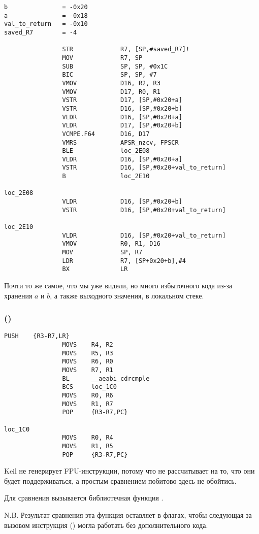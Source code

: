 \begin{lstlisting}[caption=\NonOptimizingXcodeIV (\ARMMode)]
b               = -0x20
a               = -0x18
val_to_return   = -0x10
saved_R7        = -4

                STR             R7, [SP,#saved_R7]!
                MOV             R7, SP
                SUB             SP, SP, #0x1C
                BIC             SP, SP, #7
                VMOV            D16, R2, R3
                VMOV            D17, R0, R1
                VSTR            D17, [SP,#0x20+a]
                VSTR            D16, [SP,#0x20+b]
                VLDR            D16, [SP,#0x20+a]
                VLDR            D17, [SP,#0x20+b]
                VCMPE.F64       D16, D17
                VMRS            APSR_nzcv, FPSCR
                BLE             loc_2E08
                VLDR            D16, [SP,#0x20+a]
                VSTR            D16, [SP,#0x20+val_to_return]
                B               loc_2E10

loc_2E08
                VLDR            D16, [SP,#0x20+b]
                VSTR            D16, [SP,#0x20+val_to_return]

loc_2E10
                VLDR            D16, [SP,#0x20+val_to_return]
                VMOV            R0, R1, D16
                MOV             SP, R7
                LDR             R7, [SP+0x20+b],#4
                BX              LR
\end{lstlisting}

Почти то же самое, что мы уже видели, 
но много избыточного кода из-за хранения $a$ и $b$, 
а также выходного значения, в локальном стеке.


\subsubsection{\OptimizingKeilVI (\ThumbMode)}

\begin{lstlisting}[caption=\OptimizingKeilVI (\ThumbMode)]
                PUSH    {R3-R7,LR}
                MOVS    R4, R2
                MOVS    R5, R3
                MOVS    R6, R0
                MOVS    R7, R1
                BL      __aeabi_cdrcmple
                BCS     loc_1C0
                MOVS    R0, R6
                MOVS    R1, R7
                POP     {R3-R7,PC}

loc_1C0
                MOVS    R0, R4
                MOVS    R1, R5
                POP     {R3-R7,PC}
\end{lstlisting}

Keil не генерирует FPU-инструкции, потому что не 
рассчитывает на то, что они будет поддерживаться, а простым сравнением побитово здесь не обойтись.

Для сравнения вызывается библиотечная функция . 

N.B. Результат сравнения эта функция оставляет в флагах, чтобы следующая за вызовом инструкция
 ()
могла работать без дополнительного кода.

